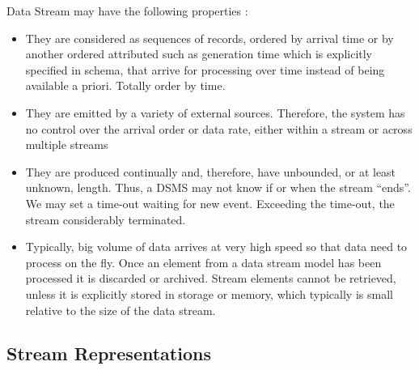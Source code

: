 Data Stream may have the following properties \citep{Golab:2010}:
\begin{itemize}
	\item They are considered as sequences of records, ordered by arrival time or by another ordered attributed such as generation time which is explicitly specified in schema, that arrive for processing over time instead of being available a priori. Totally order by time. 
	\item They are emitted by a variety of external sources. Therefore, the system has no control over the arrival order or data rate, either within a stream or across multiple streams
	\item They are produced continually and, therefore, have unbounded, or at least unknown, length. Thus, a DSMS may not know if or when the stream ``ends''. We may set a time-out waiting for new event. Exceeding the time-out, the stream considerably terminated. 
	\item Typically, big volume of data arrives at very high speed so that data need to process on the fly. Once an element from a data stream model has been processed it is discarded or archived. Stream elements cannot be retrieved, unless it is explicitly stored in storage or memory, which typically is small relative to the size of the data stream. \citep{Babcock:2002}
	
\end{itemize}


\subsection*{Stream Representations}
